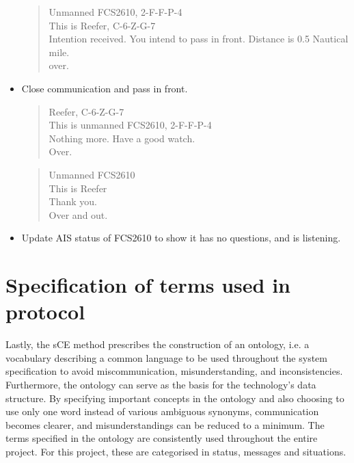 \begin{itemize}
	\begin{quote}
		Unmanned FCS2610, 2-F-F-P-4 \\
		This is Reefer, C-6-Z-G-7\\
		Intention received. You intend to pass in front. Distance is 0.5 Nautical mile.\\
		over.
	\end{quote}
	\item Close communication and pass in front.
	\begin{quote}
		Reefer, C-6-Z-G-7\\
		This is unmanned FCS2610, 2-F-F-P-4 \\
		Nothing more. Have a good watch. \\
		Over.
	\end{quote}
	\begin{quote}
		Unmanned FCS2610\\
		This is Reefer\\
		Thank you. \\
		Over and out.
	\end{quote}
	\item Update AIS status of FCS2610 to show it has no questions, and is listening.
\end{itemize}

\section{Specification of terms used in protocol}
Lastly, the sCE method prescribes the construction of an ontology, i.e. a vocabulary describing a common language to be used throughout the system specification to avoid miscommunication, misunderstanding, and inconsistencies. Furthermore, the ontology can serve as the basis for the technology’s data structure. By specifying important concepts in the ontology and also choosing to use only one word instead of various ambiguous synonyms, communication becomes clearer, and misunderstandings can be reduced to a minimum. The terms specified in the ontology are consistently used throughout the entire project. For this project, these are categorised in status, messages and situations.

